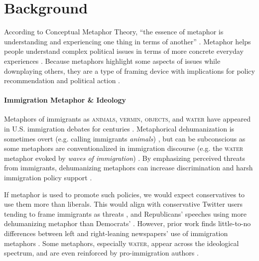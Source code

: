 \section{Background}

According to Conceptual Metaphor Theory, ``the essence of metaphor is understanding and experiencing one thing in terms of another'' \cite[p.~5]{lakoff1980metaphors}. Metaphor 
helps people understand complex political issues in terms of more concrete everyday experiences \citep{burgers_figurative_2016}. Because metaphors highlight some aspects of issues while downplaying others, they 
are a type of framing device \citep{Entman1993,burgers_figurative_2016} %
with implications for 
policy recommendation and political action \citep{lakoff1980metaphors}.

\paragraph{Immigration Metaphor \& Ideology}

Metaphors of immigrants as \textsc{animals}, \textsc{vermin}, \textsc{objects}, and \textsc{water} have appeared in U.S. immigration debates for centuries \citep{obrien_indigestible_2003,card2022computational}. Metaphorical dehumanization is sometimes overt (e.g. calling immigrants \textit{animals}) \citep{ana_like_1999}, but can be subconscious as some metaphors are conventionalized in immigration discourse (e.g. the \textsc{water} metaphor evoked by \textit{waves of immigration}) \citep{porto_water_2022}. By emphasizing perceived threats from immigrants, dehumanizing metaphors can increase discrimination and harsh immigration policy support \citep{ana_like_1999,utych_how_2018}.

If metaphor is used to promote such policies, we would expect conservatives to use them more than liberals. This would align with conservative Twitter users tending to frame immigrants as threats \citep{mendelsohn2021modeling}, and Republicans' speeches using more dehumanizing metaphor than Democrats' \citep{card2022computational}. However, prior work 
finds little-to-no differences between left and right-leaning newspapers' use of immigration metaphors \citep{arcimaviciene_migration_2018,benczes_migrants_2022,porto_water_2022}. Some metaphors, especially \textsc{water}, appear across the ideological spectrum, and are even reinforced by pro-immigration authors \citep{el2001metaphors}.

